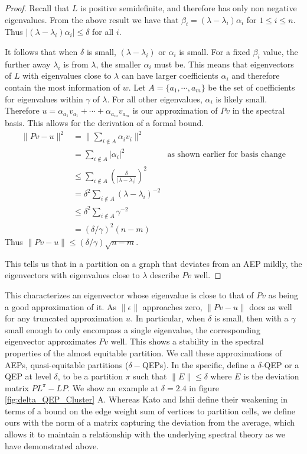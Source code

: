 \documentclass[%
 aip,
 amsmath,amssymb,
preprint,
reprint, onecolumn %
]{revtex4-1}
\begin{document}
\begin{proof}
    Recall that $L$ is positive semidefinite, and therefore has only non negative eigenvalues. From the above result we have that $\beta_i=(\lambda-\lambda_i)\alpha_i$ for $1\leq i\leq n$. Thus $|(\lambda-\lambda_i)\alpha_i| \leq \delta$ for all $i$.
    
    It follows that when $\delta$ is small, $(\lambda-\lambda_i)$ or $\alpha_i$ is small. For a fixed $\beta_i$ value, the further away $\lambda_i$ is from $\lambda$, the smaller $\alpha_i$ must be. This means that eigenvectors of $L$ with eigenvalues close to $\lambda$ can have larger coefficients $\alpha_i$ and therefore contain the most information of $w$. Let $A=\{a_1,\cdots,a_m\}$ be the set of coefficients for eigenvalues within $\gamma$ of $\lambda$. For all other eigenvalues, $\alpha_i$ is likely small. Therefore $u= \alpha_{a_1}v_{a_1}+\cdots+\alpha_{a_m}v_{a_m}$ is our approximation of $Pv$ in the spectral basis. This allows for the derivation of a formal bound.
    \begin{align*}
        \|Pv - u\|^2 &= \|\sum_{i\not\in A} \alpha_i v_i\|^2\\
        &= \sum_{i\not\in A} |\alpha_i|^2    &\text{as shown earlier for basis change}\\
        &\leq \sum_{i\not\in A} \left(\frac{\delta}{|\lambda-\lambda_i|}\right)^2\\
        &= \delta^2 \sum_{i\not\in A} \left(\lambda-\lambda_i\right)^{-2}\\
        &\leq \delta^2 \sum_{i\not\in A} \gamma^{-2}\\
        &= (\delta/\gamma)^{2} (n-m) 
    \end{align*}
    Thus $\|Pv-u\| \leq (\delta/\gamma) \sqrt{n-m}$.

    
    This tells us that in a partition on a graph that deviates from an AEP mildly, the eigenvectors with eigenvalues close to $\lambda$ describe $Pv$ well.
\end{proof}

This characterizes an eigenvector whose eigenvalue is close to that of $Pv$ as being a good approximation of it. As $\|\epsilon\|$ approaches zero, $\|Pv-u\|$ does as well for any truncated approximation $u$. In particular, when $\delta$ is small, then with a $\gamma$ small enough to only encompass a single eigenvalue, the corresponding  eigenvector approximates $Pv$ well. This shows a stability in the spectral properties of the almost equitable partition. We call these approximations of AEPs, quasi-equitable partitions ($\delta-$QEPs). In the specific, define a $\delta$-QEP or a QEP at level $\delta$, to be a partition $\pi$ such that $\|E\| \leq \delta$ where $E$ is the deviation matrix $PL^\pi - LP$. We show an example at $\delta=2.4$ in figure \ref{fig:delta_QEP_Cluster} A.
Whereas Kato and Ishii\cite{kato_cluster_2023} define their weakening in terms of a bound on the edge weight sum of vertices to partition cells, we define ours with the norm of a matrix capturing the deviation from the average, which allows it to maintain a relationship with the underlying spectral theory as we have demonstrated above.
\end{document}
